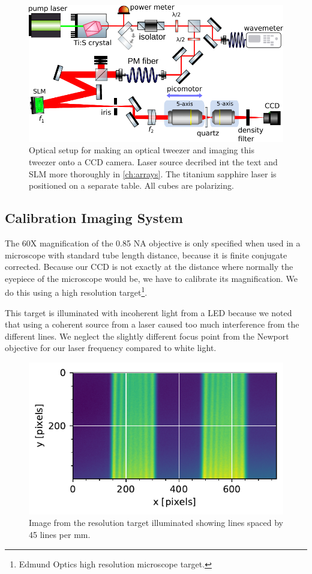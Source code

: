 \begin{figure}
    \centering
    \includegraphics[width=0.8\linewidth]{figures/TiSandSLM.pdf}
    \caption{Optical setup for making an optical tweezer and imaging this tweezer onto a CCD camera. 
    Laser source decribed int the text and \ac{SLM} more thoroughly in \cref{ch:arrays}.
    The titanium sapphire laser is positioned on a separate table. 
    All cubes are polarizing.}
    \label{fig:TiSandSLMsetup}
\end{figure}

\subsection{Calibration Imaging System}

The 60X magnification of the 0.85 NA objective is only specified when used in a microscope with standard tube length distance, because it is finite conjugate corrected.
Because our CCD is not exactly at the distance where normally the eyepiece of the microscope would be, we have to calibrate its magnification.
We do this using a high resolution target\footnote{Edmund Optics high resolution microscope target.}.

This target is illuminated with incoherent light from a \ac{LED} because we noted that using a coherent source from a laser caused too much interference from the different lines. We neglect the slightly different focus point from the Newport objective for our laser frequency compared to white light. 

\begin{figure}
    \centering
    \includegraphics[width = 0.45\linewidth]{figures/linespacing.pdf}
    \caption{Image from the resolution target illuminated showing lines spaced by 45 lines per mm.}
    \label{fig:resolutionTarget}
\end{figure}

